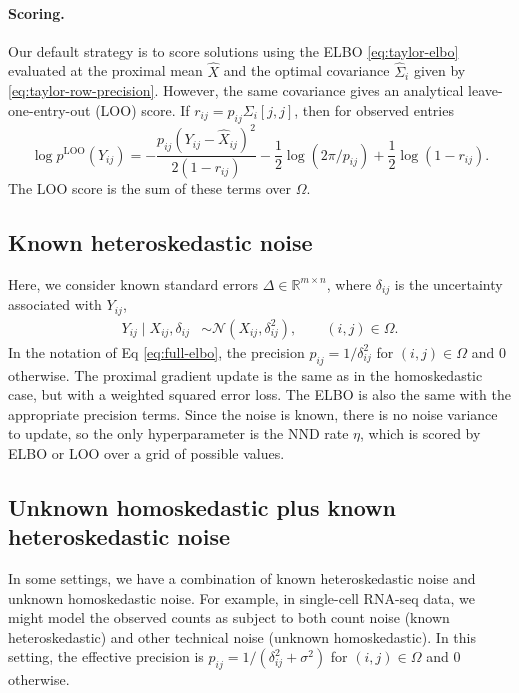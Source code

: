 \documentclass[11pt]{article}
\begin{document}
\paragraph{Scoring.} Our default strategy is to score solutions using the ELBO \eqref{eq:taylor-elbo} evaluated at the proximal mean $\hat X$ and the optimal covariance $\hat \Sigma_i$ given by \eqref{eq:taylor-row-precision}. However, the same covariance gives an analytical leave-one-entry-out (LOO) score.  If
$r_{ij}=p_{ij}\Sigma_i[j,j]$, then for observed entries
\begin{equation} \log p^{\mathrm{LOO}}(Y_{ij}) = -\frac{p_{ij}(Y_{ij}-\hat X_{ij})^2}{2(1-r_{ij})} -\frac{1}{2}\log(2\pi/p_{ij}) +\frac{1}{2}\log(1-r_{ij}).
\end{equation}
The LOO score is the sum of these terms over $\Omega$.

\subsection{Known heteroskedastic noise}

Here, we consider known standard errors $\Delta \in \mathbb{R}^{m \times n}$, where $\delta_{ij}$ is the uncertainty associated with $Y_{ij}$, 
\begin{align}
Y_{ij} \mid X_{ij}, \delta_{ij} &\sim \mathcal{N}(X_{ij}, \delta_{ij}^2), \qquad (i,j)\in\Omega.
\end{align}
In the notation of Eq \eqref{eq:full-elbo}, the precision $p_{ij} = 1/\delta_{ij}^2$ for $(i,j)\in\Omega$ and $0$ otherwise. The proximal gradient update is the same as in the homoskedastic case, but with a weighted squared error loss. The ELBO is also the same with the appropriate precision terms. Since the noise is known, there is no noise variance to update, so the only hyperparameter is the NND rate $\eta$, which is scored by ELBO or LOO over a grid of possible values. 

\subsection{Unknown homoskedastic plus known heteroskedastic noise}

In some settings, we have a combination of known heteroskedastic noise and unknown homoskedastic noise. For example, in single-cell RNA-seq data, we might model the observed counts as subject to both count noise (known heteroskedastic) and other technical noise (unknown homoskedastic). In this setting, the effective precision is $p_{ij} = 1/(\delta_{ij}^2 + \sigma^2)$ for $(i,j)\in\Omega$ and $0$ otherwise. 
\end{document}
